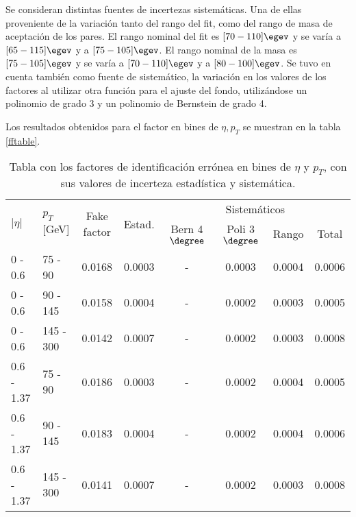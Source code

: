 Se consideran distintas fuentes de incertezas sistemáticas. Una de ellas proveniente de la variación tanto del rango del fit, como del rango de masa de aceptación de los pares. El rango nominal del fit es $[70-110]\egev$ y se varía a $[65-115]\egev$ y a $[75-105]\egev$. El rango nominal de la masa es $[75-105]\egev$ y se varía a $[70-110]\egev$ y a $[80-100]\egev$. Se tuvo en cuenta también como fuente de sistemático, la variación en los valores de los factores al utilizar otra función para el ajuste del fondo, utilizándose un polinomio de grado 3 y un polinomio de Bernstein de grado 4.

Los resultados obtenidos para el factor en bines de $\eta , p_{T}$ se muestran en la tabla \ref{fftable}.

\begin{table}	
\centering
\begin{threeparttable}
\caption{Tabla con los factores de identificación errónea en bines de $\eta$ y $p_{T}$, con sus valores de incerteza estadística y sistemática.}
\begin{tabular}{ l l c c c c c c }

	\hline
	\hline

	\multirow{2}{*}{$|\eta|$} & \multirow{2}{*}{$p_{T}$[GeV]} & \multirow{2}{*}{Fake factor} & \multirow{2}{*}{Estad.} & \multicolumn{4}{c}{Sistemáticos} \\

	\cline{5-8}

	 & & & & Bern 4$\degree$ & Poli 3$\degree$ & Rango & Total \\


	\hline

	0 - 0.6 & 75 - 90 & 0.0168 & 0.0003 & -			& 0.0003  &  0.0004 &  0.0006  \\

	0 - 0.6 & 90 - 145 & 0.0158 & 0.0004 & - 		& 0.0002  &  0.0003 &  0.0005  \\

	0 - 0.6 & 145 - 300 & 0.0142 & 0.0007 & -  		& 0.0002  &  0.0003 &  0.0008  \\

	\hline

	0.6 - 1.37 & 75 - 90 & 0.0186 & 0.0003 & -		& 0.0002  &  0.0004 &  0.0005  \\

	0.6 - 1.37 & 90 - 145 & 0.0183 & 0.0004 & -		& 0.0002  &  0.0004 &  0.0006  \\

	0.6 - 1.37 & 145 - 300 & 0.0141 & 0.0007 & -  	& 0.0002  &  0.0003 &  0.0008  \\


\end{tabular}
\end{threeparttable}
\end{table}
